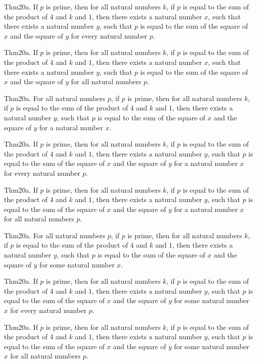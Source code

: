 \documentclass{article}
\begin{document}
Thm20a. If $p$ is prime, then for all natural numbers $k$, if $p$ is equal to the sum of the product of $4$ and $k$ and $1$, then there exists a natural number $x$, such that there exists a natural number $y$, such that $p$ is equal to the sum of the square of $x$ and the square of $y$ for every natural number $p$.

Thm20a. If $p$ is prime, then for all natural numbers $k$, if $p$ is equal to the sum of the product of $4$ and $k$ and $1$, then there exists a natural number $x$, such that there exists a natural number $y$, such that $p$ is equal to the sum of the square of $x$ and the square of $y$ for all natural numbers $p$.

Thm20a. For all natural numbers $p$, if $p$ is prime, then for all natural numbers $k$, if $p$ is equal to the sum of the product of $4$ and $k$ and $1$, then there exists a natural number $y$, such that $p$ is equal to the sum of the square of $x$ and the square of $y$ for a natural number $x$.

Thm20a. If $p$ is prime, then for all natural numbers $k$, if $p$ is equal to the sum of the product of $4$ and $k$ and $1$, then there exists a natural number $y$, such that $p$ is equal to the sum of the square of $x$ and the square of $y$ for a natural number $x$ for every natural number $p$.

Thm20a. If $p$ is prime, then for all natural numbers $k$, if $p$ is equal to the sum of the product of $4$ and $k$ and $1$, then there exists a natural number $y$, such that $p$ is equal to the sum of the square of $x$ and the square of $y$ for a natural number $x$ for all natural numbers $p$.

Thm20a. For all natural numbers $p$, if $p$ is prime, then for all natural numbers $k$, if $p$ is equal to the sum of the product of $4$ and $k$ and $1$, then there exists a natural number $y$, such that $p$ is equal to the sum of the square of $x$ and the square of $y$ for some natural number $x$.

Thm20a. If $p$ is prime, then for all natural numbers $k$, if $p$ is equal to the sum of the product of $4$ and $k$ and $1$, then there exists a natural number $y$, such that $p$ is equal to the sum of the square of $x$ and the square of $y$ for some natural number $x$ for every natural number $p$.

Thm20a. If $p$ is prime, then for all natural numbers $k$, if $p$ is equal to the sum of the product of $4$ and $k$ and $1$, then there exists a natural number $y$, such that $p$ is equal to the sum of the square of $x$ and the square of $y$ for some natural number $x$ for all natural numbers $p$.
\end{document}
